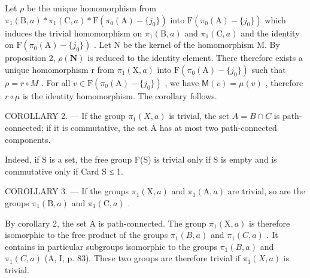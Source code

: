 Let \(\rho\) be the unique homomorphism from \(\pi_1(\mathrm{B},a)*\pi_1(\mathrm{C},a)*\mathrm{F}(\pi_0(\mathrm{A})-\{j_0\})\) into \(\mathrm{F}(\pi_0(\mathrm{A}) - \{j_0\})\) which induces the trivial homomorphism on \(\pi_1(\mathrm{B},a)\) and \(\pi_1(\mathrm{C},a)\) and the identity on \(\mathrm{F}(\pi_0(\mathrm{A}) - \{j_0\})\) . Let N be the kernel of the homomorphism M. By proposition 2, \(\rho (\mathbf{N})\) is reduced to the identity element. There therefore exists a unique homomorphism r from \(\pi_1(\mathrm{X},a)\) into \(\mathrm{F}(\pi_0(\mathrm{A}) - \{j_0\})\) such that \(\rho = r\circ M\) . For all \(v\in \mathrm{F}(\pi_0(\mathrm{A}) - \{j_0\})\) , we have \(\mathsf{M}(v) = \mu (v)\) , therefore \(r\circ \mu\) is the identity homomorphism. The corollary follows.

COROLLARY 2. --- If the group \(\pi_{1}(X,a)\) is trivial, the set \(A = B \cap C\) is path-connected; if it is commutative, the set A has at most two path-connected components.

Indeed, if S is a set, the free group F(S) is trivial only if S is empty and is commutative only if Card S ≤ 1.

COROLLARY 3. --- If the groups \(\pi_1(\mathrm{X},a)\) and \(\pi_1(\mathrm{A},a)\) are trivial, so are the groups \(\pi_1(\mathrm{B},a)\) and \(\pi_1(\mathrm{C},a)\) .

By corollary 2, the set A is path-connected. The group \(\pi_1(\mathrm{X},a)\) is therefore isomorphic to the free product of the groups \(\pi_{1}(B,a)\) and \(\pi_{1}(C,a)\) . It contains in particular subgroups isomorphic to the groups \(\pi_{1}(B,a)\) and \(\pi_{1}(C,a)\) (A, I, p. 83). These two groups are therefore trivial if \(\pi_{1}(X,a)\) is trivial.

